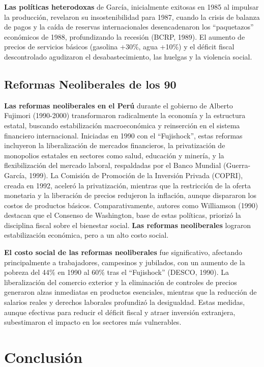 \documentclass[
  jou,
  floatsintext,
  longtable,
  a4paper,
  nolmodern,
  notxfonts,
  notimes,
  12pt,
  colorlinks=true,linkcolor=blue,citecolor=blue,urlcolor=blue]{apa7}
\begin{document}
\textbf{Las políticas heterodoxas} de García, inicialmente exitosas en
1985 al impulsar la producción, revelaron su insostenibilidad para 1987,
cuando la crisis de balanza de pagos y la caída de reservas
internacionales desencadenaron los ``paquetazos'' económicos de 1988,
profundizando la recesión (BCRP, 1989). El aumento de precios de
servicios básicos (gasolina +30\%, agua +10\%) y el déficit fiscal
descontrolado agudizaron el desabastecimiento, las huelgas y la
violencia social.

\subsection{Reformas Neoliberales de los
90}\label{reformas-neoliberales-de-los-90}

\textbf{Las reformas neoliberales en el Perú} durante el gobierno de
Alberto Fujimori (1990-2000) transformaron radicalmente la economía y la
estructura estatal, buscando estabilización macroeconómica y reinserción
en el sistema financiero internacional. Iniciadas en 1990 con el
``Fujishock'', estas reformas incluyeron la liberalización de mercados
financieros, la privatización de monopolios estatales en sectores como
salud, educación y minería, y la flexibilización del mercado laboral,
respaldadas por el Banco Mundial (Guerra-García, 1999). La Comisión de
Promoción de la Inversión Privada (COPRI), creada en 1992, aceleró la
privatización, mientras que la restricción de la oferta monetaria y la
liberación de precios redujeron la inflación, aunque dispararon los
costos de productos básicos. Comparativamente, autores como Williamson
(1990) destacan que el Consenso de Washington, base de estas políticas,
priorizó la disciplina fiscal sobre el bienestar social. \textbf{Las
reformas neoliberales} lograron estabilización económica, pero a un alto
costo social.

\textbf{El costo social de las reformas neoliberales} fue significativo,
afectando principalmente a trabajadores, campesinos y jubilados, con un
aumento de la pobreza del 44\% en 1990 al 60\% tras el ``Fujishock''
(DESCO, 1990). La liberalización del comercio exterior y la eliminación
de controles de precios generaron alzas inmediatas en productos
esenciales, mientras que la reducción de salarios reales y derechos
laborales profundizó la desigualdad. Estas medidas, aunque efectivas
para reducir el déficit fiscal y atraer inversión extranjera,
subestimaron el impacto en los sectores más vulnerables.

\section{Conclusión}\label{conclusiuxf3n}
\end{document}
